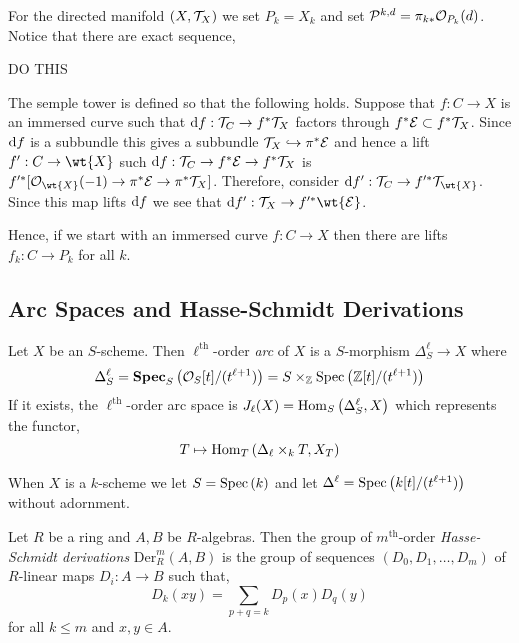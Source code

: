 \documentclass[12pt]{article}
\newcommand{\cO}{\mathcal{O}}
\begin{document}
\begin{example}
For the directed manifold $(X, \mathcal{T}_X)$ we set $P_k = X_k$ and set $\cP^{k,d} = \pi_{k*} \cO_{P_k}(d)$. Notice that there are exact sequence,

{\color{red} DO THIS}
\end{example}

The semple tower is defined so that the following holds. Suppose that $f : C \to X$ is an immersed curve such that $\mathrm{d}{f} : \mathcal{T}_C \to f^* \mathcal{T}_X$ factors through $f^* \mathcal{E} \subset f^* \mathcal{T}_X$. Since $\mathrm{d}{f}$ is a subbundle this gives a subbundle $\mathcal{T}_X \hookrightarrow \pi^* \mathcal{E}$ and hence a lift $f' : C \to \wt{X}$ such $\mathrm{d}{f} : \mathcal{T}_C \to f^* \mathcal{E} \to f^* \mathcal{T}_X$ is $f'^* [\struct{\wt{X}}(-1) \to \pi^* \E \to \pi^* \T_X]$. Therefore, consider $\d{f'} : \T_C \to f'^* \T_{\wt{X}}$. Since this map lifts $\mathrm{d}{f}$ we see that $\d{f'} : \T_X \to f'^* \wt{\E}$.

Hence, if we start with an immersed curve $f : C \to X$ then there are lifts $f_k : C \to P_k$ for all $k$.

\subsection{Arc Spaces and Hasse-Schmidt Derivations}

\begin{defn}
Let $X$ be an $S$-scheme. Then $\ell^{\text{th}}$-order \textit{arc} of $X$ is a $S$-morphism $\Delta^\ell_S \to X$ where 
\[ \Delta^{\ell}_S = \mathbf{Spec}_{S}\left( \mathcal{O}_{S}[t]/(t^{\ell+1}) \right) = S \times_{\mathbb{Z}} \mathrm{Spec}\left( \mathbb{Z}[t]/(t^{\ell + 1}) \right) \]
If it exists, the $\ell^{\text{th}}$-order arc space is $J_\ell(X) = \mathrm{Hom}_{S} \left( \Delta^\ell_S, X \right)$ which represents the functor,
\[ T \mapsto \mathrm{Hom}_{T} \left( \Delta_\ell \times_k T, X_T \right) \]
\end{defn}

When $X$ is a $k$-scheme we let $S = \mathrm{Spec}\left( k \right)$ and let $\Delta^\ell = \mathrm{Spec}\left( k[t]/(t^{\ell + 1}) \right)$ without adornment.

\newcommand{\HSDer}[4]{\mathrm{Der}^{#2}_{#1}\left(#3, #4\right)}
\newcommand{\HS}{\mathrm{HS}}

\begin{defn}
Let $R$ be a ring and $A, B$ be $R$-algebras. Then the group of $m^{\text{th}}$-order \textit{Hasse-Schmidt derivations} $\HSDer{R}{m}{A}{B}$ is the group of sequences $(D_0, D_1, \dots, D_m)$ of $R$-linear maps $D_i : A \to B$ such that,
\[ D_k(xy) = \sum_{p + q = k} D_p(x) D_q(y) \]
for all $k \le m$ and $x,y \in A$.
\end{defn}
\end{document}
